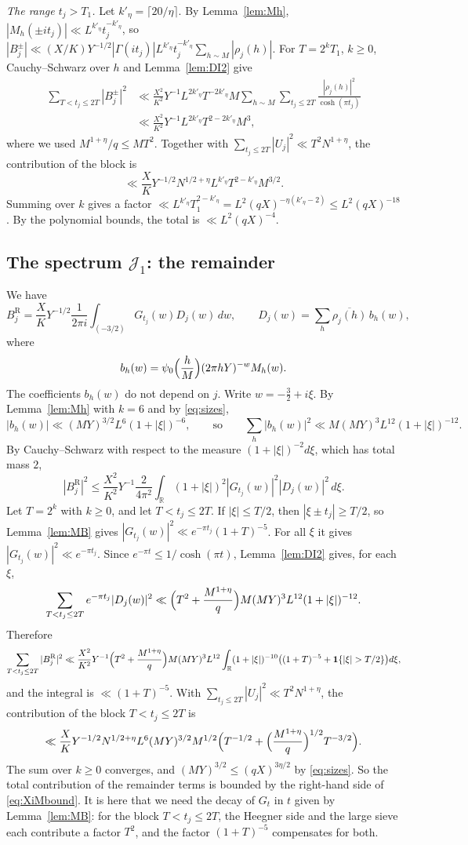 \documentclass[11pt]{amsart}
\theoremstyle{remark}
\theoremstyle{definition}
\numberwithin{equation}{section}
\newcommand{\Jc}{\mathcal{J}}
\newcommand{\R}{\mathbb{R}}
\newcommand{\one}{\mathbf{1}}
\begin{document}
\emph{The range $t_j>T_1$.} Let $k'_\eta=\lceil20/\eta\rceil$. By Lemma~\ref{lem:Mh}, $|M_h(\pm it_j)|\ll L^{k'_\eta}t_j^{-k'_\eta}$, so $|B_j^\pm|\ll(X/K)Y^{-1/2}|\Gamma(it_j)|L^{k'_\eta}t_j^{-k'_\eta}\sum_{h\sim M}|\rho_j(h)|$. For $T=2^kT_1$, $k\ge0$, Cauchy--Schwarz over $h$ and Lemma~\ref{lem:DI2} give
\begin{align*}
\sum_{T<t_j\le2T}|B_j^\pm|^2&\ll\frac{X^2}{K^2}Y^{-1}L^{2k'_\eta}T^{-2k'_\eta}M\sum_{h\sim M}\sum_{t_j\le2T}\frac{|\rho_j(h)|^2}{\cosh(\pi t_j)}\\
&\ll\frac{X^2}{K^2}Y^{-1}L^{2k'_\eta}T^{2-2k'_\eta}M^{3},
\end{align*}
where we used $M^{1+\eta}/q\le MT^2$. Together with $\sum_{t_j\le2T}|U_j|^2\ll T^2N^{1+\eta}$, the contribution of the block is
\[
\ll\frac XKY^{-1/2}N^{1/2+\eta}L^{k'_\eta}T^{2-k'_\eta}M^{3/2}.
\]
Summing over $k$ gives a factor $\ll L^{k'_\eta}T_1^{2-k'_\eta}=L^2(qX)^{-\eta(k'_\eta-2)}\le L^2(qX)^{-18}$. By the polynomial bounds, the total is $\ll L^2(qX)^{-4}$.

\subsection{\texorpdfstring{The spectrum $\Jc_1$: the remainder}{The spectrum J\_1: the remainder}}\label{sec:J1rem}
We have
\[
B_j^{\mathrm R}=\frac XKY^{-1/2}\frac1{2\pi i}\int_{(-3/2)}G_{t_j}(w)D_j(w)\,dw,\qquad D_j(w)=\sum_h\overline{\rho_j(h)}\,b_h(w),
\]
where
\[
b_h(w)=\psi_0\Bigl(\frac hM\Bigr)(2\pi hY)^{-w}M_h(w).
\]
The coefficients $b_h(w)$ do not depend on $j$. Write $w=-\frac32+i\xi$. By Lemma~\ref{lem:Mh} with $k=6$ and by \eqref{eq:sizes},
\[
|b_h(w)|\ll(MY)^{3/2}L^6(1+|\xi|)^{-6},\qquad\text{so}\qquad\sum_h|b_h(w)|^2\ll M(MY)^3L^{12}(1+|\xi|)^{-12}.
\]
By Cauchy--Schwarz with respect to the measure $(1+|\xi|)^{-2}d\xi$, which has total mass $2$,
\[
|B_j^{\mathrm R}|^2\le\frac{X^2}{K^2}Y^{-1}\frac{2}{4\pi^2}\int_\R(1+|\xi|)^2|G_{t_j}(w)|^2|D_j(w)|^2\,d\xi.
\]
Let $T=2^k$ with $k\ge0$, and let $T<t_j\le2T$. If $|\xi|\le T/2$, then $|\xi\pm t_j|\ge T/2$, so Lemma~\ref{lem:MB} gives $|G_{t_j}(w)|^2\ll e^{-\pi t_j}(1+T)^{-5}$. For all $\xi$ it gives $|G_{t_j}(w)|^2\ll e^{-\pi t_j}$. Since $e^{-\pi t}\le1/\cosh(\pi t)$, Lemma~\ref{lem:DI2} gives, for each $\xi$,
\[
\sum_{T<t_j\le2T}e^{-\pi t_j}|D_j(w)|^2\ll\Bigl(T^2+\frac{M^{1+\eta}}q\Bigr)M(MY)^3L^{12}(1+|\xi|)^{-12}.
\]
Therefore
\[
\sum_{T<t_j\le2T}|B_j^{\mathrm R}|^2\ll\frac{X^2}{K^2}Y^{-1}\Bigl(T^2+\frac{M^{1+\eta}}q\Bigr)M(MY)^3L^{12}\int_\R(1+|\xi|)^{-10}\bigl((1+T)^{-5}+\one\{|\xi|>T/2\}\bigr)d\xi,
\]
and the integral is $\ll(1+T)^{-5}$. With $\sum_{t_j\le2T}|U_j|^2\ll T^2N^{1+\eta}$, the contribution of the block $T<t_j\le2T$ is
\[
\ll\frac XKY^{-1/2}N^{1/2+\eta}L^6(MY)^{3/2}M^{1/2}\Bigl(T^{-1/2}+\Bigl(\frac{M^{1+\eta}}q\Bigr)^{1/2}T^{-3/2}\Bigr).
\]
The sum over $k\ge0$ converges, and $(MY)^{3/2}\le(qX)^{3\eta/2}$ by \eqref{eq:sizes}. So the total contribution of the remainder terms is bounded by the right-hand side of \eqref{eq:XiMbound}. It is here that we need the decay of $G_t$ in $t$ given by Lemma~\ref{lem:MB}: for the block $T<t_j\le2T$, the Heegner side and the large sieve each contribute a factor $T^2$, and the factor $(1+T)^{-5}$ compensates for both.
\end{document}
